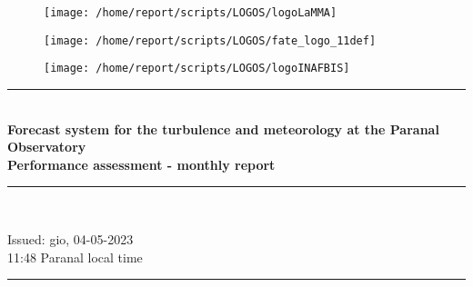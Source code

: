 \documentclass[11pt,english]{article}
\newcommand{\HRule}{\rule{\linewidth}{0.5mm}}
\begin{document}
\begin{figure}
\begin{center}
\hspace{1.5cm}
\parbox{5.5cm}{\texttt{[image: /home/report/scripts/LOGOS/logoLaMMA]}}
\hspace{.3cm}
\parbox{5.5cm}{\texttt{[image: /home/report/scripts/LOGOS/fate\_logo\_11def]}}
\hspace{.3cm}
\parbox{5.5cm}{\texttt{[image: /home/report/scripts/LOGOS/logoINAFBIS]}}
\hspace{.1cm}
\vspace{1.2cm}
\end{center}
\end{figure}

\begin{center}
\HRule \\[0.4cm]
\Huge{\textbf{Forecast system for the turbulence and meteorology at the Paranal Observatory}}
\\[0.4cm]
\LARGE{\textbf{Performance assessment - monthly report}}
\HRule \\[0.4cm]
\end{center}

\begin{center}
\vspace{2cm}\Huge{Issued: gio, 04-05-2023\\ 11:48 Paranal local time}
\HRule \\[0.1cm]
\end{center}

\clearpage
\end{document}
